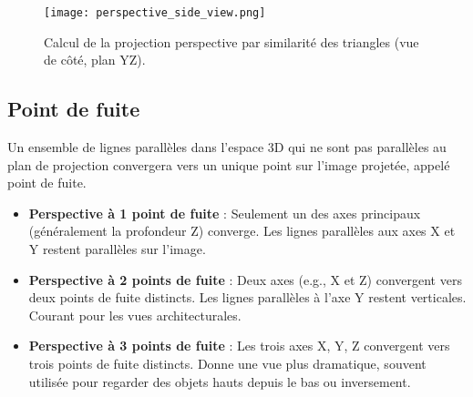 \begin{figure}[H]
\centering
\texttt{[image: perspective\_side\_view.png]}
\caption{Calcul de la projection perspective par similarité des triangles (vue de côté, plan YZ).}
\label{fig:perspective_side_view}
\end{figure}
\subsection{Point de fuite}
Un ensemble de lignes parallèles dans l'espace 3D qui ne sont pas parallèles au plan de projection convergera vers un unique point sur l'image projetée, appelé point de fuite.
\begin{itemize}
    \item \textbf{Perspective à 1 point de fuite} : Seulement un des axes principaux (généralement la profondeur Z) converge. Les lignes parallèles aux axes X et Y restent parallèles sur l'image.
    \item \textbf{Perspective à 2 points de fuite} : Deux axes (e.g., X et Z) convergent vers deux points de fuite distincts. Les lignes parallèles à l'axe Y restent verticales. Courant pour les vues architecturales.
    \item \textbf{Perspective à 3 points de fuite} : Les trois axes X, Y, Z convergent vers trois points de fuite distincts. Donne une vue plus dramatique, souvent utilisée pour regarder des objets hauts depuis le bas ou inversement.
\end{itemize}
